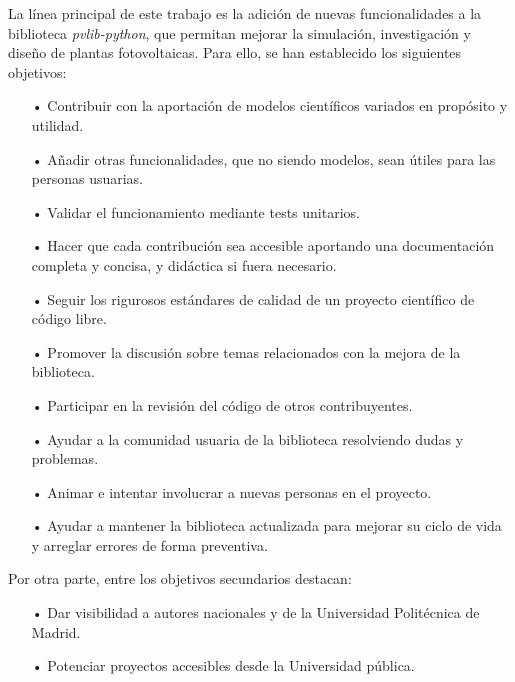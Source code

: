 La línea principal de este trabajo es la adición de nuevas funcionalidades a la biblioteca \textit{pvlib-python}, que permitan mejorar la simulación, investigación y diseño de plantas fotovoltaicas. Para ello, se han establecido los siguientes objetivos:

\begin{itemize}

    \item[•] Contribuir con la aportación de modelos científicos variados en propósito y utilidad.

    \item[•] Añadir otras funcionalidades, que no siendo modelos, sean útiles para las personas usuarias.

    \item[•] Validar el funcionamiento mediante tests unitarios.

    \item[•] Hacer que cada contribución sea accesible aportando una documentación completa y concisa, y didáctica si fuera necesario.

    \item[•] Seguir los rigurosos estándares de calidad de un proyecto científico de código libre.
    
    \item[•] Promover la discusión sobre temas relacionados con la mejora de la biblioteca.

    \item[•] Participar en la revisión del código de otros contribuyentes.

    \item[•] Ayudar a la comunidad usuaria de la biblioteca resolviendo dudas y problemas.

    \item[•] Animar e intentar involucrar a nuevas personas en el proyecto.

    \item[•] Ayudar a mantener la biblioteca actualizada para mejorar su ciclo de vida y arreglar errores de forma preventiva.

\end{itemize}

Por otra parte, entre los objetivos secundarios destacan:

\begin{itemize}

    \item [•] Dar visibilidad a autores nacionales y de la Universidad Politécnica de Madrid.

    \item [•] Potenciar proyectos accesibles desde la Universidad pública.

\end{itemize}

